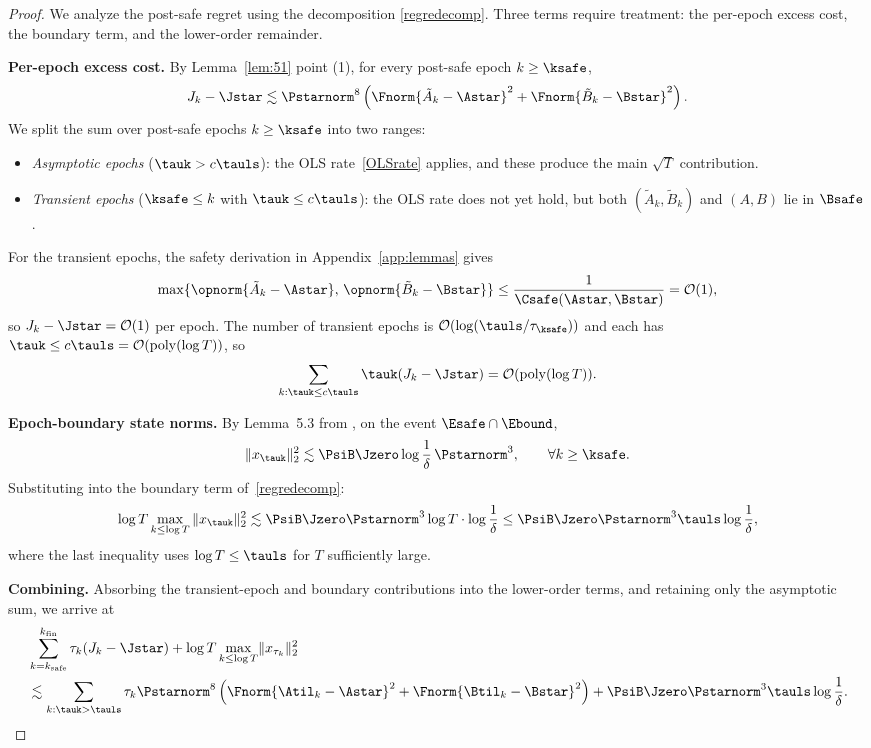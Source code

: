 \documentclass[11pt,journal,onecolumn]{IEEEtran}
\newcommand{\safe}{\mathrm{safe}}
\begin{document}
\begin{proof}
    We analyze the post-safe regret using the decomposition \eqref{regredecomp}. Three terms require treatment: the per-epoch excess cost, the boundary term, and the lower-order remainder.

    \medskip\noindent\textbf{Per-epoch excess cost.}
    By Lemma~\ref{lem:51} point (1), for every post-safe epoch $k \ge \ksafe$,
    \begin{equation}\label{eq:Jk-bound}
        J_k - \Jstar \lesssim \Pstarnorm^8 \left(\Fnorm{\tilde A_k - \Astar}^2 + \Fnorm{\tilde B_k - \Bstar}^2\right).
    \end{equation}
    We split the sum over post-safe epochs $k \ge \ksafe$ into two ranges:
    \begin{itemize}
        \item \emph{Asymptotic epochs} ($\tauk > c\tauls$): the OLS rate~\eqref{OLSrate} applies, and these produce the main $\sqrt{T}$ contribution.
        \item \emph{Transient epochs} ($\ksafe \le k$ with $\tauk \le c\tauls$): the OLS rate does not yet hold, but both $(\tilde A_k, \tilde B_k)$ and $(A,B)$ lie in $\Bsafe$.
    \end{itemize}
    For the transient epochs, the safety derivation in Appendix~\ref{app:lemmas} gives
    \[
        \max\{\opnorm{\tilde A_k - \Astar},\, \opnorm{\tilde B_k - \Bstar}\} \le \frac{1}{\Csafe(\Astar,\Bstar)} = \mathcal{O}(1),
    \]
    so $J_k - \Jstar = \mathcal{O}(1)$ per epoch. The number of transient epochs is $\mathcal{O}(\log(\tauls/\tau_{\ksafe}))$ and each has $\tauk \le c\tauls = \mathcal{O}(\mathrm{poly}(\log T))$, so
    \[
        \sum_{k: \tauk \le c\tauls} \tauk (J_k - \Jstar) = \mathcal{O}(\mathrm{poly}(\log T)).
    \]

    \medskip\noindent\textbf{Epoch-boundary state norms.}
    By Lemma~5.3 from \cite{simchowitz20a}, on the event $\Esafe \cap \Ebound$,
    \[
        \|x_{\tauk}\|_2^2 \lesssim \PsiB \Jzero \log\frac{1}{\delta}\, \Pstarnorm^3, \qquad \forall k \ge \ksafe.
    \]
    Substituting into the boundary term of~\eqref{regredecomp}:
    \[
        \log T \max_{k \le \log T} \|x_{\tauk}\|_2^2 \lesssim \PsiB \Jzero \Pstarnorm^3 \log T \cdot \log\frac{1}{\delta} \le \PsiB \Jzero \Pstarnorm^3 \tauls \log\frac{1}{\delta},
    \]
    where the last inequality uses $\log T \le \tauls$ for $T$ sufficiently large.

    \medskip\noindent\textbf{Combining.}
    Absorbing the transient-epoch and boundary contributions into the lower-order terms, and retaining only the asymptotic sum, we arrive at
    \begin{align}
         & \sum_{k=k_\safe}^{k_{\mathrm{fin}}} \tau_k(J_k - \Jstar) + \log T \max_{k \leq \log T} \lVert x_{\tau_k}\rVert_2^2 \nonumber \\
         & \lesssim \sum_{k: \tauk > \tauls} \tau_k \Pstarnorm^8 \left( \Fnorm{\Atil_k - \Astar}^2 + \Fnorm{\Btil_k - \Bstar}^2 \right) + \PsiB \Jzero \Pstarnorm^3 \tauls\log \frac{1}{\delta}. \label{eq:post-safe-split}
    \end{align}


\end{proof}
\end{document}
